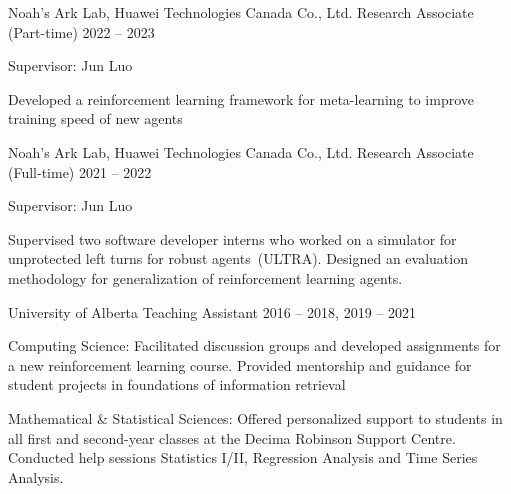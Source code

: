   \vspace{-4mm}
\begin{cventries}
  \cventry
    {Noah's Ark Lab, Huawei Technologies Canada Co., Ltd.}
    {Research Associate (Part-time)}
    {2022 -- 2023}
    {
      \vspace{-4.0mm}
      \begin{cvitems}
        \item[>>] Supervisor: Jun Luo
        \item[>>] Developed a reinforcement learning framework for meta-learning to improve training speed of new agents
      \end{cvitems}
    }

  \cventry
    {Noah's Ark Lab, Huawei Technologies Canada Co., Ltd.}
    {Research Associate (Full-time)}
    {2021 -- 2022}
    {
      \vspace{-4.0mm}
      \begin{cvitems}
        \item[>>] Supervisor: Jun Luo
        \item[>>] Supervised two software developer interns who worked on a simulator for unprotected left turns for robust agents~(ULTRA). Designed an evaluation methodology for generalization of reinforcement learning agents.
      \end{cvitems}
    }

  \cventry
    {University of Alberta}
    {Teaching Assistant}
    {2016 -- 2018, 2019 -- 2021} 
    {
      \vspace{-4.0mm}
      \begin{cvitems}
        \item[>>] Computing Science: Facilitated discussion groups and developed assignments for a new reinforcement learning course. Provided mentorship and guidance for student projects in foundations of information retrieval
        \item[>>] Mathematical \& Statistical Sciences: Offered personalized support to students in all first and second-year classes at the Decima Robinson Support Centre. Conducted help sessions Statistics I/II, Regression Analysis and Time Series Analysis.
      \end{cvitems}
    }



\end{cventries}
